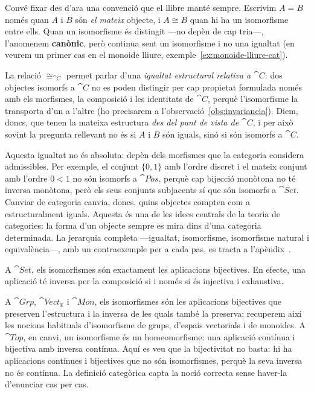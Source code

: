 \begin{observacio}\label{obs:igualtat-isomorfisme}
Convé fixar des d'ara una convenció que el llibre manté sempre. Escrivim $A=B$ només quan $A$ i $B$ són \emph{el mateix} objecte, i $A\cong B$ quan hi ha un isomorfisme entre ells. Quan un isomorfisme és distingit ---no depèn de cap tria---, l'anomenem \textbf{canònic}, però continua sent un isomorfisme i no una igualtat (en veurem un primer cas en el monoide lliure, exemple~\ref{ex:monoide-lliure-cat}).

La relació $\cong_{\cat{C}}$ permet parlar d'una \emph{igualtat estructural relativa a $\cat{C}$}: dos objectes isomorfs a $\cat{C}$ no es poden distingir per cap propietat formulada només amb els morfismes, la composició i les identitats de $\cat{C}$, perquè l'isomorfisme la transporta d'un a l'altre (ho precisarem a l'observació~\ref{obs:invariancia}). Diem, doncs, que tenen la mateixa estructura \emph{des del punt de vista de $\cat{C}$}, i per això sovint la pregunta rellevant no és si $A$ i $B$ són iguals, sinó si són isomorfs a $\cat{C}$.

Aquesta igualtat no és absoluta: depèn dels morfismes que la categoria considera admissibles. Per exemple, el conjunt $\{0,1\}$ amb l'ordre discret i el mateix conjunt amb l'ordre $0<1$ no són isomorfs a $\cat{Pos}$, perquè cap bijecció monòtona no té inversa monòtona, però els seus conjunts subjacents sí que són isomorfs a $\cat{Set}$. Canviar de categoria canvia, doncs, quins objectes compten com a estructuralment iguals. Aquesta és una de les idees centrals de la teoria de categories: la forma d'un objecte sempre es mira dins d'una categoria determinada.
La jerarquia completa ---igualtat, isomorfisme, isomorfisme natural i equivalència---, amb un contraexemple per a cada pas, es tracta a l'apèndix~.
\end{observacio}

\begin{exemple}
A $\cat{Set}$, els isomorfismes són exactament les aplicacions bijectives. En efecte, una aplicació té inversa per la composició si i només si és injectiva i exhaustiva.
\end{exemple}

\begin{exemple}
A $\cat{Grp}$, $\cat{Vect}_{\mathbb K}$ i $\cat{Mon}$, els isomorfismes són les aplicacions bijectives que preserven l'estructura i la inversa de les quals també la preserva; recuperem així les nocions habituals d'isomorfisme de grups, d'espais vectorials i de monoides. A $\cat{Top}$, en canvi, un isomorfisme és un homeomorfisme: una aplicació contínua i bijectiva amb inversa contínua. Aquí es veu que la bijectivitat no basta: hi ha aplicacions contínues i bijectives que no són isomorfismes, perquè la seva inversa no és contínua. La definició categòrica capta la noció correcta sense haver-la d'enunciar cas per cas.
\end{exemple}

